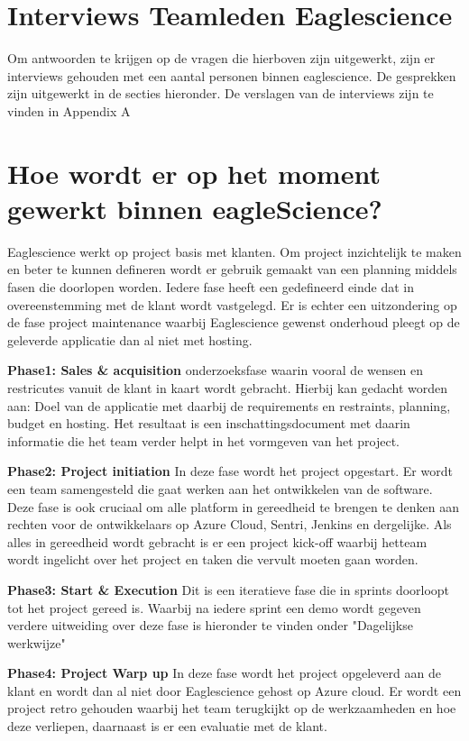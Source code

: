 \section{Interviews Teamleden Eaglescience}\label{sec:interviews-teamleden-eaglescience}
Om antwoorden te krijgen op de vragen die hierboven zijn uitgewerkt, zijn er interviews gehouden met een aantal personen binnen eaglescience.
De gesprekken zijn uitgewerkt in de secties hieronder.
De verslagen van de interviews zijn te vinden in Appendix A

\section{Hoe wordt er op het moment gewerkt binnen eagleScience?}\label{sec:hoe-wordt-er-op-het-moment-gewerkt-binnen-eaglescience?}
Eaglescience werkt op project basis met klanten.
Om project inzichtelijk te maken en beter te kunnen defineren wordt er gebruik gemaakt van een planning middels fasen die doorlopen worden.
Iedere fase heeft een gedefineerd einde dat in overeenstemming met de klant wordt vastgelegd.
Er is echter een uitzondering op de fase project maintenance waarbij Eaglescience gewenst onderhoud pleegt op de geleverde applicatie dan al niet met hosting.
\medskip

\textbf{Phase1: Sales \& acquisition}
onderzoeksfase waarin vooral de wensen en restricutes vanuit de klant in kaart wordt gebracht.
Hierbij kan gedacht worden aan: Doel van de applicatie met daarbij de requirements en restraints, planning, budget en hosting.
Het resultaat is een inschattingsdocument met daarin informatie die het team verder helpt in het vormgeven van het project.

\textbf{Phase2: Project initiation}
In deze fase wordt het project opgestart.
Er wordt een team samengesteld die gaat werken aan het ontwikkelen van de software.
Deze fase is ook cruciaal om alle platform in gereedheid te brengen te denken aan rechten voor de ontwikkelaars op Azure Cloud, Sentri, Jenkins en dergelijke.
Als alles in gereedheid wordt gebracht is er een project kick-off waarbij hetteam wordt ingelicht over het project en taken die vervult moeten gaan worden.

\textbf{Phase3: Start \& Execution}
Dit is een iteratieve fase die in sprints doorloopt tot het project gereed is.
Waarbij na iedere sprint een demo wordt gegeven verdere uitweiding over deze fase is hieronder te vinden onder "Dagelijkse werkwijze"

\textbf{Phase4: Project Warp up}
In deze fase wordt het project opgeleverd aan de klant en wordt dan al niet door Eaglescience gehost op Azure cloud.
Er wordt een project retro gehouden waarbij het team terugkijkt op de werkzaamheden en hoe deze verliepen, daarnaast is er een evaluatie met de klant.

